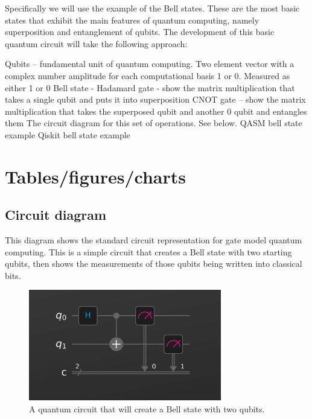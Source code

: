 \documentclass{article}
\begin{document}
Specifically we will use the example of the Bell states. These are the most basic states that exhibit the main features of quantum computing, namely superposition and entanglement of qubits. The development of this basic quantum circuit will take the following approach:
\begin{outline}[enumerate]
\1 Qubits -- fundamental unit of quantum computing. Two element vector with a complex number amplitude for each computational basis 1 or 0. Measured as either 1 or 0
\1 Bell state - 
    \2 Hadamard gate - show the matrix multiplication that takes a single qubit and puts it into superposition
    \2 CNOT gate -- show the matrix multiplication that takes the superposed qubit and another 0 qubit and entangles them
\1 The circuit diagram for this set of operations. See below.
\1 QASM bell state example
\1 Qiskit bell state example
\end{outline}
\section{Tables/figures/charts}
\subsection{Circuit diagram}
This diagram shows the standard circuit representation for gate model quantum computing. This is a simple circuit that creates a Bell state with two starting qubits, then shows the measurements of those qubits being written into classical bits.
\begin{figure}[H]
    \centering
    \includegraphics[width=0.75\textwidth]{circuit.png}
    \caption{A quantum circuit that will create a Bell state with two qubits.}
\end{figure}
\end{document}
